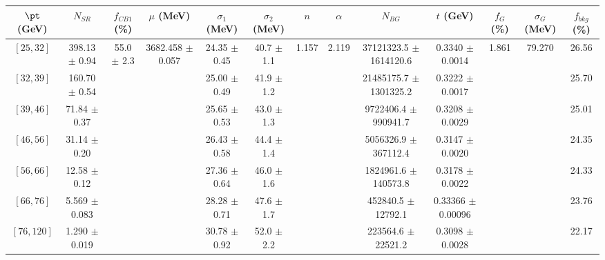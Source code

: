 \begin{tabular}{c||c|c|c|c|c|c|c|c|c|c|c||c}
$\pt$ (GeV) & $N_{SR}$ & $f_{CB1}$ (\%) & $\mu$ (MeV) & $\sigma_1$ (MeV) & $\sigma_2$ (MeV) & $n$ & $\alpha$ & $N_{BG}$ & $t$ (GeV) & $f_G$ (\%) & $\sigma_G$ (MeV) & $f_{bkg}$ (\%) \\
\hline
$[25, 32]$ & 398.13 $\pm$ 0.94 & \multirow{7}{*}{55.0 $\pm$ 2.3} & \multirow{7}{*}{3682.458 $\pm$ 0.057} & 24.35 $\pm$ 0.45 & 40.7 $\pm$ 1.1 & \multirow{7}{*}{1.157} & \multirow{7}{*}{2.119} & 37121323.5 $\pm$ 1614120.6 & 0.3340 $\pm$ 0.0014 & \multirow{7}{*}{1.861} & \multirow{7}{*}{79.270} & 26.56\\
$[32, 39]$ & 160.70 $\pm$ 0.54 &  &  & 25.00 $\pm$ 0.49 & 41.9 $\pm$ 1.2 &  &  & 21485175.7 $\pm$ 1301325.2 & 0.3222 $\pm$ 0.0017 &  &  & 25.70\\
$[39, 46]$ & 71.84 $\pm$ 0.37 &  &  & 25.65 $\pm$ 0.53 & 43.0 $\pm$ 1.3 &  &  & 9722406.4 $\pm$ 990941.7 & 0.3208 $\pm$ 0.0029 &  &  & 25.01\\
$[46, 56]$ & 31.14 $\pm$ 0.20 &  &  & 26.43 $\pm$ 0.58 & 44.4 $\pm$ 1.4 &  &  & 5056326.9 $\pm$ 367112.4 & 0.3147 $\pm$ 0.0020 &  &  & 24.35\\
$[56, 66]$ & 12.58 $\pm$ 0.12 &  &  & 27.36 $\pm$ 0.64 & 46.0 $\pm$ 1.6 &  &  & 1824961.6 $\pm$ 140573.8 & 0.3178 $\pm$ 0.0022 &  &  & 24.33\\
$[66, 76]$ & 5.569 $\pm$ 0.083 &  &  & 28.28 $\pm$ 0.71 & 47.6 $\pm$ 1.7 &  &  & 452840.5 $\pm$ 12792.1 & 0.33366 $\pm$ 0.00096 &  &  & 23.76\\
$[76, 120]$ & 1.290 $\pm$ 0.019 &  &  & 30.78 $\pm$ 0.92 & 52.0 $\pm$ 2.2 &  &  & 223564.6 $\pm$ 22521.2 & 0.3098 $\pm$ 0.0028 &  &  & 22.17\\
\end{tabular}
